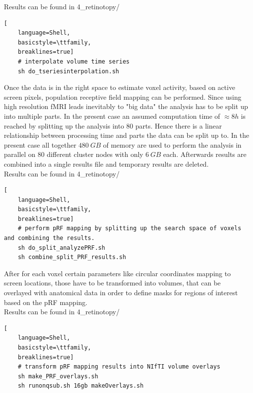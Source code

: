 \documentclass[12pt,a4paper]{scrartcl}
\begin{document}
\noindent Results can be found in 4\_retinotopy/\\
\begin{lstlisting}[
    language=Shell,
    basicstyle=\ttfamily,
    breaklines=true]
    # interpolate volume time series
    sh do_tseriesinterpolation.sh
\end{lstlisting}
Once the data is in the right space to estimate voxel activity, based on active screen pixels, population receptive field mapping can be performed. Since using high resolution fMRI leads inevitably to "big data" the analysis has to be split up into multiple parts. In the present case an assumed computation time of $\approx 8h$ is reached by splitting up the analysis into 80 parts. Hence there is a linear relationship between processing time and parts the data can be split up to. In the present case all together $480~GB$ of memory are used to perform the analysis in parallel on 80 different cluster nodes with only $6~GB$ each. Afterwards results are combined into a single results file and temporary results are deleted.\\

\noindent Results can be found in 4\_retinotopy/\\
\begin{lstlisting}[
    language=Shell,
    basicstyle=\ttfamily,
    breaklines=true]
    # perform pRF mapping by splitting up the search space of voxels and combining the results.
    sh do_split_analyzePRF.sh
    sh combine_split_PRF_results.sh
\end{lstlisting}
After for each voxel certain parameters like circular coordinates mapping to screen locations, those have to be transformed into volumes, that can be overlayed with anatomical data in order to define masks for regions of interest based on the pRF mapping.\\

\noindent Results can be found in 4\_retinotopy/\\
\begin{lstlisting}[
    language=Shell,
    basicstyle=\ttfamily,
    breaklines=true]
    # transform pRF mapping results into NIfTI volume overlays
    sh make_PRF_overlays.sh
    sh runonqsub.sh 16gb makeOverlays.sh
\end{lstlisting}
\end{document}

